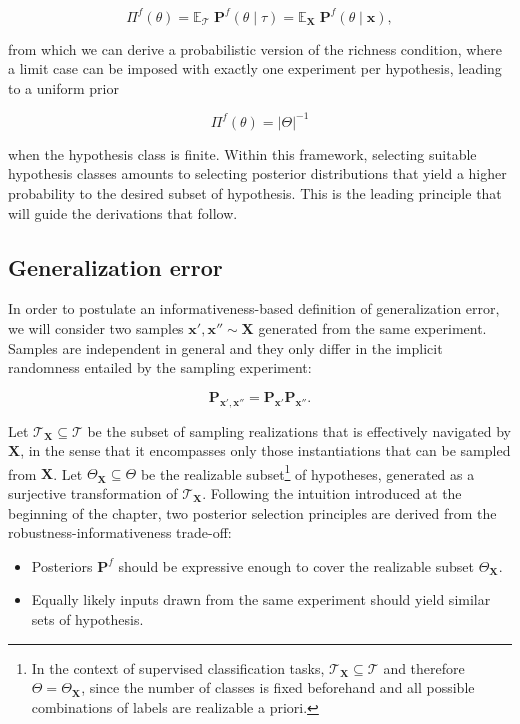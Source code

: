 $$
 \Pi^f (\theta) = \mathbb{E}_{\mathcal{T}} \; \mathbf{P}^f (\theta \mid \tau) = \mathbb{E}_{\bm{X}} \; \mathbf{P}^f (\theta \mid \bm{x}),
$$

from which we can derive a probabilistic version of the richness condition, where a limit
case can be imposed with exactly one experiment per hypothesis, leading to a uniform prior

$$
\Pi^f (\theta) = |\Theta|^{-1}
$$

when the hypothesis class is finite. Within this framework, selecting suitable hypothesis classes amounts to selecting
posterior distributions that yield a higher probability to the desired subset of hypothesis. This
is the leading principle that will guide the derivations that follow.

\subsection{Generalization error}

In order to postulate an informativeness-based definition of generalization error, we will consider
two samples $\bm{x}', \bm{x}'' \sim \bm{X}$ generated from the same experiment. Samples are independent in
general and they only differ in the implicit randomness entailed by the sampling experiment:

$$
    \mathbf{P}_{\bm{x}', \bm{x}''} = \mathbf{P}_{\bm{x}'} \mathbf{P}_{\bm{x}''}.
$$

\begin{proposition}
    Let $\mathcal{T}_{\bm{X}} \subseteq \mathcal{T}$ be the subset of sampling realizations 
    that is effectively navigated by $\bm{X}$, in the sense that it encompasses only those instantiations
    that can be sampled from $\bm{X}$. Let $\Theta_{\bm{X}} \subseteq \Theta$ be the realizable 
    subset\footnote{
        \flushbottom In the context of supervised classification tasks, $\mathcal{T}_{\bm{X}} \subseteq \mathcal{T}$ and 
        therefore $\Theta = \Theta_{\bm{X}}$, since the number of classes
        is fixed beforehand and all possible combinations of labels are realizable a priori.
    } 
    of hypotheses, generated as a surjective transformation of $\mathcal{T}_{\bm{X}}$. Following
    the intuition introduced at the beginning of the chapter, two posterior selection principles are 
    derived from the robustness-informativeness trade-off:
    \begin{itemize}
        \item Posteriors $\mathbf{P}^f$ should be expressive enough to cover the realizable subset $\Theta_{\bm{X}}$.
        \vspace{-2.5mm}
        \item Equally likely inputs drawn from the same experiment should yield similar sets of hypothesis.
    \end{itemize}
\end{proposition}


